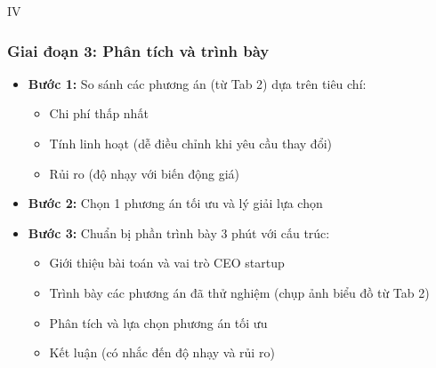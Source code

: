 \documentclass[12pt,a4paper]{article}
\begin{document}
\begin{competitionsection}{IV}
\subsubsection*{Giai đoạn 3: Phân tích và trình bày}
\begin{itemize}[leftmargin=*,noitemsep]
\item \textbf{Bước 1:} So sánh các phương án (từ Tab 2) dựa trên tiêu chí:
    \begin{itemize}
    \item Chi phí thấp nhất
    \item Tính linh hoạt (dễ điều chỉnh khi yêu cầu thay đổi)
    \item Rủi ro (độ nhạy với biến động giá)
    \end{itemize}
\item \textbf{Bước 2:} Chọn 1 phương án tối ưu và lý giải lựa chọn
\item \textbf{Bước 3:} Chuẩn bị phần trình bày 3 phút với cấu trúc:
    \begin{itemize}
    \item Giới thiệu bài toán và vai trò CEO startup
    \item Trình bày các phương án đã thử nghiệm (chụp ảnh biểu đồ từ Tab 2)
    \item Phân tích và lựa chọn phương án tối ưu
    \item Kết luận (có nhắc đến độ nhạy và rủi ro)
    \end{itemize}
\end{itemize}


\end{competitionsection}
\end{document}
